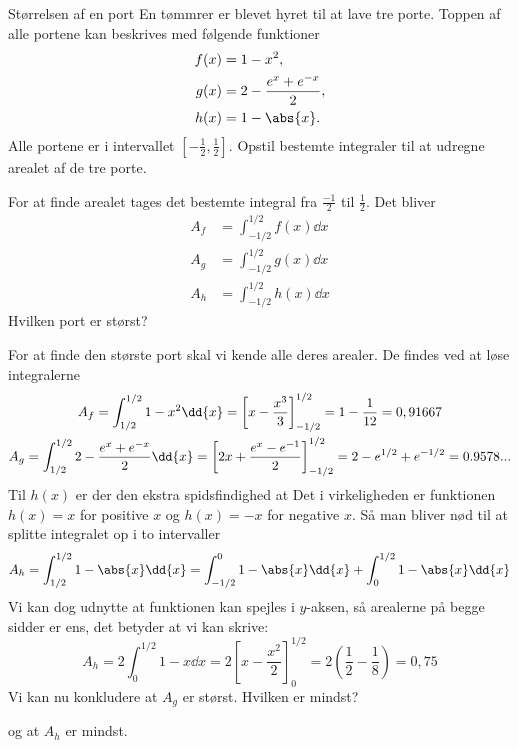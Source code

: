\begin{opgave}{Størrelsen af en port}
    En tømmrer er blevet hyret til at lave tre porte.
    Toppen af alle portene kan beskrives med følgende funktioner
    \begin{align*}
        f(x)&=1-x^2,\\
        g(x)&=2-\frac{e^x+e^{-x}}{2},\\
        h(x) &= 1-\abs{x}.
    \end{align*}
    Alle portene er i intervallet $[-\frac{1}{2},\frac{1}{2}]$.
    \opg Opstil bestemte integraler til at udregne arealet af de tre porte.
    
    For at finde arealet tages det bestemte integral fra $\frac{-1}{2}$ til $\frac{1}{2}$. Det bliver
    \begin{align*}
        A_f&=\int_{-1/2}^{1/2}f(x)\dd{x}\\
        A_g&=\int_{-1/2}^{1/2}g(x)\dd{x}\\
        A_h&=\int_{-1/2}^{1/2}h(x)\dd{x}
    \end{align*}
    \opg Hvilken port er størst?
    
    For at finde den største port skal vi kende alle deres arealer. De findes ved at løse integralerne
    \begin{gather*}
        A_f=\int_{\-1/2}^{1/2}1-x^2\dd{x}=\left[x-\frac{x^3}{3}\right]_{-1/2}^{1/2}=1-\frac{1}{12}=0,91667\\
        A_g=\int_{\-1/2}^{1/2}2-\frac{e^x+e^{-x}}{2}\dd{x}=\left[2x+\frac{e^x-e^{-1}}{2}\right]_{-1/2}^{1/2}=2-e^{1/2}+e^{-1/2}=0.9578...
    \end{gather*}
    Til $h(x)$ er der den ekstra spidsfindighed at Det i virkeligheden er funktionen $h(x)=x$ for positive $x$ og $h(x)=-x$ for negative $x$.
    Så man bliver nød til at splitte integralet op i to intervaller
    $$
    A_h=\int_{\-1/2}^{1/2}1-\abs{x}\dd{x}=\int_{-1/2}^{0}1-\abs{x}\dd{x}+\int_{0}^{1/2}1-\abs{x}\dd{x}
    $$
    Vi kan dog udnytte at funktionen kan spejles i $y$-aksen, så arealerne på begge sidder er ens, det betyder at vi kan skrive:
    $$
    A_h=2\int_0^{1/2}1-x\dd{x}=2\left[x-\frac{x^2}{2}\right]_0^{1/2}=2(\frac{1}{2}-\frac{1}{8})=0,75
    $$
    Vi kan nu konkludere at $A_g$ er størst.
    \opg Hvilken er mindst?
    
    og at $A_h$ er mindst.
\end{opgave}
